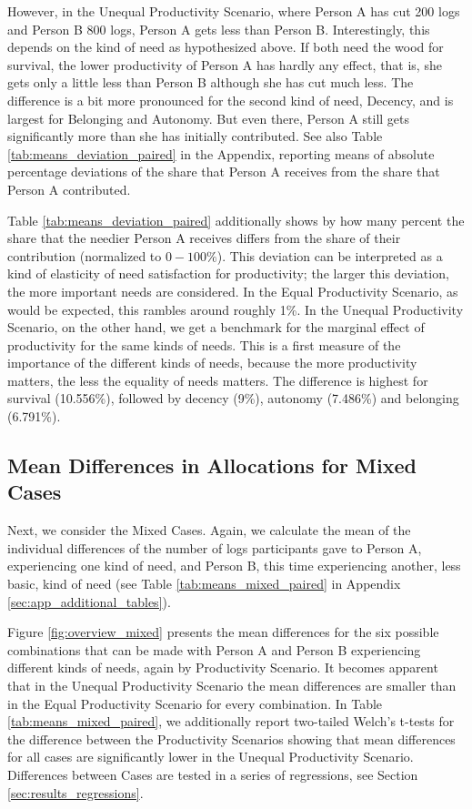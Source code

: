 \documentclass[egregdoesnotlikesansseriftitles]{scrartcl}
\begin{document}
However, in the Unequal Productivity Scenario, where Person A has cut 200 logs and Person B 800 logs, Person A gets less than Person B.
Interestingly, this depends on the kind of need as hypothesized above.
If both need the wood for survival, the lower productivity of Person A has hardly any effect, that is, she gets only a little less than Person B although she has cut much less.
The difference is a bit more pronounced for the second kind of need, Decency, and is largest for Belonging and Autonomy.
But even there, Person A still gets significantly more than she has initially contributed.
See also Table \ref{tab:means_deviation_paired} in the Appendix, reporting means of absolute percentage deviations of the share that Person A receives from the share that Person A contributed.

Table \ref{tab:means_deviation_paired} additionally shows by how many percent the share that the needier Person A receives differs from the share of their contribution (normalized to $0-100\%$).
This deviation can be interpreted as a kind of elasticity of need satisfaction for productivity; the larger this deviation, the more important needs are considered.
In the Equal Productivity Scenario, as would be expected, this rambles around roughly 1\%.
In the Unequal Productivity Scenario, on the other hand, we get a benchmark for the marginal effect of productivity for the same kinds of needs.
This is a first measure of the importance of the different kinds of needs, because the more productivity matters, the less the equality of needs matters.
The difference is highest for survival (10.556\%), followed by decency (9\%), autonomy (7.486\%) and belonging (6.791\%).


\subsection{Mean Differences in Allocations for Mixed Cases}\label{sec:results_mean_mixed}
Next, we consider the Mixed Cases.
Again, we calculate the mean of the individual differences of the number of logs participants gave to Person A, experiencing one kind of need, and Person B, this time experiencing another, less basic, kind of need (see Table \ref{tab:means_mixed_paired} in Appendix \ref{sec:app_additional_tables}).

Figure \ref{fig:overview_mixed} presents the mean differences for the six possible combinations that can be made with Person A and Person B experiencing different kinds of needs, again by Productivity Scenario.
It becomes apparent that in the Unequal Productivity Scenario the mean differences are smaller than in the Equal Productivity Scenario for every combination.
In Table \ref{tab:means_mixed_paired}, we additionally report two-tailed Welch's t-tests for the difference between the Productivity Scenarios showing that mean differences for all cases are significantly lower in the Unequal Productivity Scenario.
Differences between Cases are tested in a series of regressions, see Section \ref{sec:results_regressions}.
\end{document}
